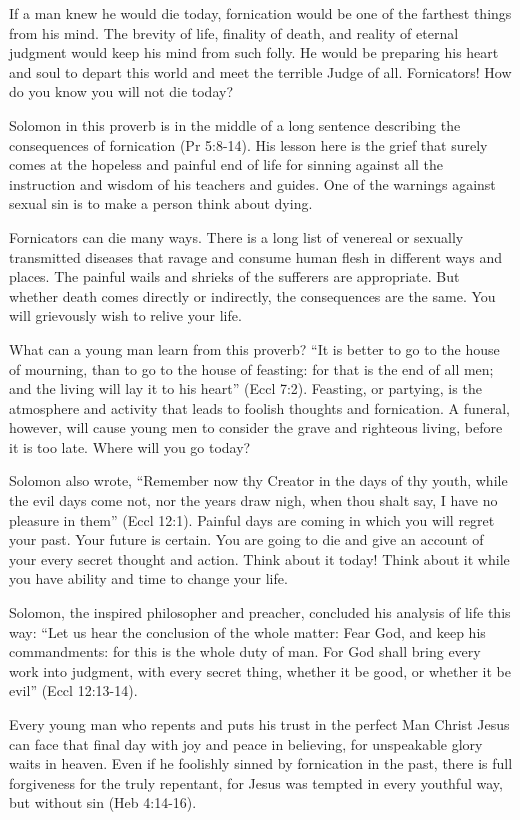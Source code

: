 If a man knew he would die today, fornication would be one of the farthest things from his mind. The brevity of life, finality of death, and reality of eternal judgment would keep his mind from such folly. He would be preparing his heart and soul to depart this world and meet the terrible Judge of all. Fornicators! How do you know you will not die today?

Solomon in this proverb is in the middle of a long sentence describing the consequences of fornication (Pr 5:8-14). His lesson here is the grief that surely comes at the hopeless and painful end of life for sinning against all the instruction and wisdom of his teachers and guides. One of the warnings against sexual sin is to make a person think about dying.

Fornicators can die many ways. There is a long list of venereal or sexually transmitted diseases that ravage and consume human flesh in different ways and places. The painful wails and shrieks of the sufferers are appropriate. But whether death comes directly or indirectly, the consequences are the same. You will grievously wish to relive your life.

What can a young man learn from this proverb? “It is better to go to the house of mourning, than to go to the house of feasting: for that is the end of all men; and the living will lay it to his heart” (Eccl 7:2). Feasting, or partying, is the atmosphere and activity that leads to foolish thoughts and fornication. A funeral, however, will cause young men to consider the grave and righteous living, before it is too late. Where will you go today?

Solomon also wrote, “Remember now thy Creator in the days of thy youth, while the evil days come not, nor the years draw nigh, when thou shalt say, I have no pleasure in them” (Eccl 12:1). Painful days are coming in which you will regret your past. Your future is certain. You are going to die and give an account of your every secret thought and action. Think about it today! Think about it while you have ability and time to change your life.

Solomon, the inspired philosopher and preacher, concluded his analysis of life this way: “Let us hear the conclusion of the whole matter: Fear God, and keep his commandments: for this is the whole duty of man. For God shall bring every work into judgment, with every secret thing, whether it be good, or whether it be evil” (Eccl 12:13-14).

Every young man who repents and puts his trust in the perfect Man Christ Jesus can face that final day with joy and peace in believing, for unspeakable glory waits in heaven. Even if he foolishly sinned by fornication in the past, there is full forgiveness for the truly repentant, for Jesus was tempted in every youthful way, but without sin (Heb 4:14-16).

